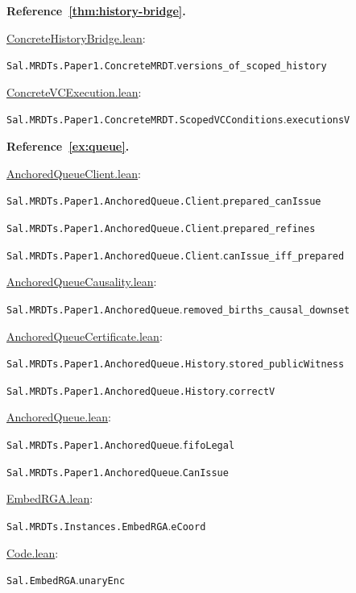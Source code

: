 \medskip\noindent\textbf{Reference~\ref{thm:history-bridge}.}\par\nobreak
\noindent\href{https://github.com/fplaunchpad/sal/blob/paper1/Sal/MRDTs/Paper1/ConcreteHistoryBridge.lean}{ConcreteHistoryBridge.lean}:\par
{\small\nolinkurl{Sal.MRDTs.Paper1.ConcreteMRDT}.\allowbreak\nolinkurl{versions_of_scoped_history}}\par
\noindent\href{https://github.com/fplaunchpad/sal/blob/paper1/Sal/MRDTs/Paper1/ConcreteVCExecution.lean}{ConcreteVCExecution.lean}:\par
{\small\nolinkurl{Sal.MRDTs.Paper1.ConcreteMRDT.ScopedVCConditions}.\allowbreak\nolinkurl{executionsV}}\par

\medskip\noindent\textbf{Reference~\ref{ex:queue}.}\par\nobreak
\noindent\href{https://github.com/fplaunchpad/sal/blob/paper1/Sal/MRDTs/Paper1/AnchoredQueueClient.lean}{AnchoredQueueClient.lean}:\par
{\small\nolinkurl{Sal.MRDTs.Paper1.AnchoredQueue.Client}.\allowbreak\nolinkurl{prepared_canIssue}}\par
{\small\nolinkurl{Sal.MRDTs.Paper1.AnchoredQueue.Client}.\allowbreak\nolinkurl{prepared_refines}}\par
{\small\nolinkurl{Sal.MRDTs.Paper1.AnchoredQueue.Client}.\allowbreak\nolinkurl{canIssue_iff_prepared}}\par
\noindent\href{https://github.com/fplaunchpad/sal/blob/07fe525/Sal/MRDTs/Paper1/AnchoredQueueCausality.lean}{AnchoredQueueCausality.lean}:\par
{\small\nolinkurl{Sal.MRDTs.Paper1.AnchoredQueue}.\allowbreak\nolinkurl{removed_births_causal_downset}}\par
\noindent\href{https://github.com/fplaunchpad/sal/blob/paper1/Sal/MRDTs/Paper1/AnchoredQueueCertificate.lean}{AnchoredQueueCertificate.lean}:\par
{\small\nolinkurl{Sal.MRDTs.Paper1.AnchoredQueue.History}.\allowbreak\nolinkurl{stored_publicWitness}}\par
{\small\nolinkurl{Sal.MRDTs.Paper1.AnchoredQueue.History}.\allowbreak\nolinkurl{correctV}}\par
\noindent\href{https://github.com/fplaunchpad/sal/blob/paper1/Sal/MRDTs/Paper1/AnchoredQueue.lean}{AnchoredQueue.lean}:\par
{\small\nolinkurl{Sal.MRDTs.Paper1.AnchoredQueue}.\allowbreak\nolinkurl{fifoLegal}}\par
{\small\nolinkurl{Sal.MRDTs.Paper1.AnchoredQueue}.\allowbreak\nolinkurl{CanIssue}}\par
\noindent\href{https://github.com/fplaunchpad/sal/blob/paper1/Sal/MRDTs/Instances/EmbedRGA.lean}{EmbedRGA.lean}:\par
{\small\nolinkurl{Sal.MRDTs.Instances.EmbedRGA}.\allowbreak\nolinkurl{eCoord}}\par
\noindent\href{https://github.com/fplaunchpad/sal/blob/paper1/Sal/MRDTs/Instances/RGAKernel/Code.lean}{Code.lean}:\par
{\small\nolinkurl{Sal.EmbedRGA}.\allowbreak\nolinkurl{unaryEnc}}\par

